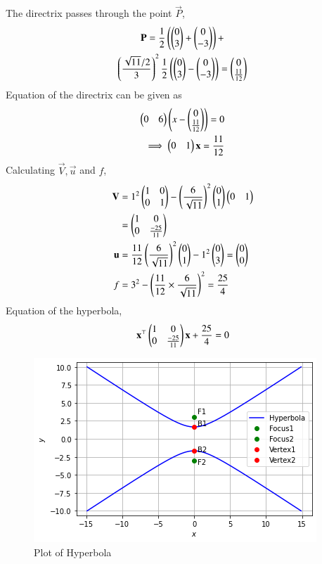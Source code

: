 \documentclass[journal,12pt,twocolumn]{IEEEtran}
\begin{document}
The directrix passes through the point $\vec{P}$,
\begin{multline}
    \mathbf{P} = \frac{1}{2}\left(\begin{pmatrix}0\\3\end{pmatrix}+\begin{pmatrix}0\\-3\end{pmatrix}\right)+\\
    \left(\frac{\sqrt{11}/2}{3}\right)^2 \frac{1}{2}\left(\begin{pmatrix}0\\3\end{pmatrix}-\begin{pmatrix}0\\-3\end{pmatrix}\right)= \begin{pmatrix}0\\\frac{11}{12}\end{pmatrix}
\end{multline}
Equation of the directrix can be given as
\begin{align}
    \begin{pmatrix}0&6\end{pmatrix}\left(x - \begin{pmatrix}0\\\frac{11}{12}\end{pmatrix}\right) = 0\\
    \implies \begin{pmatrix}0&1\end{pmatrix}\mathbf{x} = \frac{11}{12}
\end{align}
Calculating $\vec{V}, \vec{u}$ and $f$,
\begin{align}
    \mathbf{V} &= 1^2\begin{pmatrix}1&0\\0&1\end{pmatrix} - \left(\frac{6}{\sqrt{11}}\right)^2\begin{pmatrix}0\\1\end{pmatrix}\begin{pmatrix}0&1\end{pmatrix}\\
    &= \begin{pmatrix}1&0\\0&\frac{-25}{11}\end{pmatrix}\\
     \mathbf{u} &= \frac{11}{12}\left(\frac{6}{\sqrt{11}}\right)^2\begin{pmatrix}0\\1\end{pmatrix} - 1^2\begin{pmatrix}0\\3\end{pmatrix}=\begin{pmatrix}0\\0\end{pmatrix}\\
    f &= 3^2 - \left(\frac{11}{12}\times\frac{6}{\sqrt{11}}\right)^2 = \frac{25}{4}
\end{align}
Equation of the hyperbola,
\begin{align}
    \mathbf{x}^{\top}\begin{pmatrix}1&0\\0&\frac{-25}{11}\end{pmatrix}\mathbf{x}+\frac{25}{4}=0
\end{align}
\begin{figure}[h!]
\centering
\includegraphics[width=\columnwidth]{hyperbola_plot.png}
\caption{Plot of Hyperbola}
\label{fig:hyperbola}
\end{figure}
\end{document}

